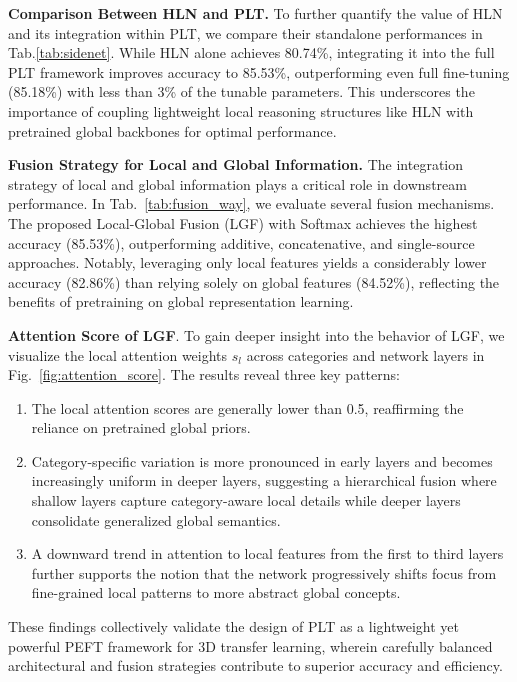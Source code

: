 \textbf{Comparison Between HLN and PLT.} To further quantify the value of HLN and its integration within PLT, we compare their standalone performances in Tab.\ref{tab:sidenet}. While HLN alone achieves 80.74\%, integrating it into the full PLT framework improves accuracy to 85.53\%, outperforming even full fine-tuning (85.18\%) with less than 3\% of the tunable parameters. This underscores the importance of coupling lightweight local reasoning structures like HLN with pretrained global backbones for optimal performance.

\textbf{Fusion Strategy for Local and Global Information.} The integration strategy of local and global information plays a critical role in downstream performance. In Tab.~\ref{tab:fusion_way}, we evaluate several fusion mechanisms. The proposed Local-Global Fusion (LGF) with Softmax achieves the highest accuracy (85.53\%), outperforming additive, concatenative, and single-source approaches. Notably, leveraging only local features yields a considerably lower accuracy (82.86\%) than relying solely on global features (84.52\%), reflecting the benefits of pretraining on global representation learning.

\textbf{Attention Score of LGF}. To gain deeper insight into the behavior of LGF, we visualize the local attention weights $s_l$ across categories and network layers in Fig.~\ref{fig:attention_score}. The results reveal three key patterns:

\begin{enumerate}
    \item The local attention scores are generally lower than 0.5, reaffirming the reliance on pretrained global priors.
    \item Category-specific variation is more pronounced in early layers and becomes increasingly uniform in deeper layers, suggesting a hierarchical fusion where shallow layers capture category-aware local details while deeper layers consolidate generalized global semantics.
    \item A downward trend in attention to local features from the first to third layers further supports the notion that the network progressively shifts focus from fine-grained local patterns to more abstract global concepts.
\end{enumerate}

These findings collectively validate the design of PLT as a lightweight yet powerful PEFT framework for 3D transfer learning, wherein carefully balanced architectural and fusion strategies contribute to superior accuracy and efficiency.


